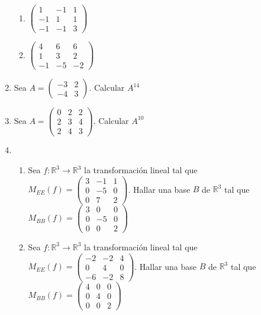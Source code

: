 \documentclass[12pt,letterpaper]{article}
\begin{document}
\begin{enumerate}
\begin{multicols}{3}
\begin{enumerate}
    \item $\begin{pmatrix}
      1 & -1  & 1\\
      -1 & 1 & 1\\
      -1 & -1 & 3
    \end{pmatrix}$
    \item $\begin{pmatrix}
      4 & 6 & 6\\
      1 & 3 & 2\\
      -1 & -5 & -2
      \end{pmatrix}$
    \end{enumerate}
  \end{multicols}  
  \item Sea $A=\begin{pmatrix}
    -3 & 2\\
    -4 & 3
  \end{pmatrix}$. Calcular $A^{14}$
  \item Sea $A=\begin{pmatrix}
    0 & 2 & 2\\
    2 & 3 & 4\\
    2 & 4 & 3  
  \end{pmatrix}$. Calcular $A^{10}$
  \item \begin{enumerate}
    \item Sea $f : \mathbb{R}^3 \rightarrow \mathbb{R}^3$ la transformación lineal tal que $M_{EE}(f) = \begin{pmatrix}
      3 & -1 & 1\\
      0 & -5 & 0\\
      0 & 7 & 2
    \end{pmatrix}$. Hallar una base $B$ de $\mathbb{R}^3$ tal que $M_{BB}(f) = \begin{pmatrix}
      3 & 0 & 0\\
      0 & -5 & 0\\
      0 & 0 & 2
    \end{pmatrix}$
    \item Sea $f : \mathbb{R}^3 \rightarrow \mathbb{R}^3$ la transformación lineal tal que $M_{EE}(f) = \begin{pmatrix}
      -2 & -2 & 4\\
      0 & 4 & 0\\
      -6 & -2 & 8
    \end{pmatrix}$. Hallar una base $B$ de $\mathbb{R}^3$ tal que $M_{BB}(f) = \begin{pmatrix}
      4 & 0 & 0\\
      0 & 4 & 0\\
      0 & 0 & 2
    \end{pmatrix}$
  \end{enumerate}
\end{enumerate}
\end{document}
